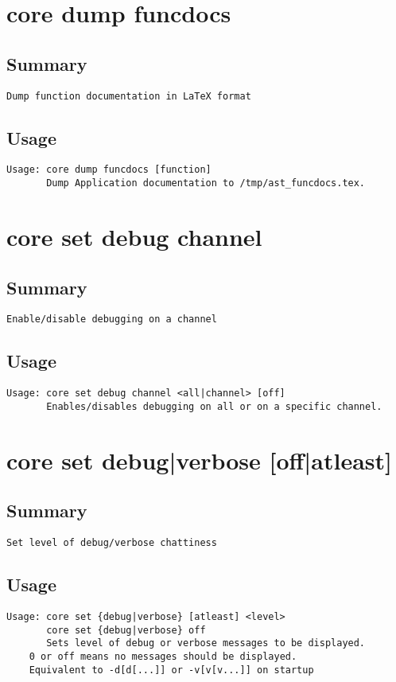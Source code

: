 \section{core dump funcdocs}
\subsection{Summary}
\begin{verbatim}
Dump function documentation in LaTeX format
\end{verbatim}
\subsection{Usage}
\begin{verbatim}
Usage: core dump funcdocs [function]
       Dump Application documentation to /tmp/ast_funcdocs.tex.

\end{verbatim}


\section{core set debug channel}
\subsection{Summary}
\begin{verbatim}
Enable/disable debugging on a channel
\end{verbatim}
\subsection{Usage}
\begin{verbatim}
Usage: core set debug channel <all|channel> [off]
       Enables/disables debugging on all or on a specific channel.

\end{verbatim}


\section{core set {debug|verbose} [off|atleast]}
\subsection{Summary}
\begin{verbatim}
Set level of debug/verbose chattiness
\end{verbatim}
\subsection{Usage}
\begin{verbatim}
Usage: core set {debug|verbose} [atleast] <level>
       core set {debug|verbose} off
       Sets level of debug or verbose messages to be displayed.
	0 or off means no messages should be displayed.
	Equivalent to -d[d[...]] or -v[v[v...]] on startup

\end{verbatim}


